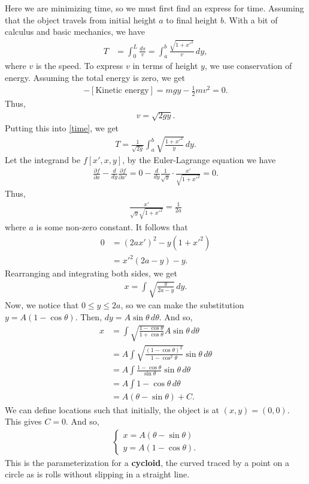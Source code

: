 \documentclass{article}
\newcommand{\p}{\partial}
\newcommand{\f}[2]{\frac{#1}{#2}}
\begin{document}
Here we are minimizing time, so we must first find an express for time. Assuming that the object travels from initial height $a$ to final height $b$. With a bit of calculus and basic mechanics, we have
\begin{align}\label{time}
T &= \int_{0}^{L} \frac{ds}{v} = \int_a^b \f{\sqrt{1 + x'^2}}{v}\,dy,
\end{align}
where $v$ is the speed. To express $v$ in terms of height $y$, we use conservation of energy. Assuming the total energy is zero, we get
\begin{align}
[\text{Potential Energy}] - [\text{Kinetic energy}] = mgy - \frac{1}{2}mv^2 = 0.
\end{align}
Thus,
\begin{align}
v = \sqrt{2gy}.
\end{align}
Putting this into \eqref{time}, we get
\begin{align}
T = \frac{1}{\sqrt{2g}}\int^b_a \sqrt{\f{1 + x'^2}{y}}\,dy.
\end{align}
Let the integrand be $f[x',x,y]$, by the Euler-Lagrange equation we have
\begin{align}
\frac{\p f}{\p x} - \f{d}{dy}\f{\p f}{\p x'} = 0 - \frac{d}{dy}\f{1}{\sqrt{y}}\cdot \f{x'}{\sqrt{1 + x'^2}}  = 0.
\end{align}
Thus,
\begin{align}
\f{x'}{\sqrt{y}\sqrt{1+x'^2}} = \f{1}{2a}
\end{align}
where $a$ is some non-zero constant. It follows that 
\begin{align}
0 &= (2ax')^2 - y(1+x'^2)\nonumber\\
&= x'^2(2a-y) - y.
\end{align}
Rearranging and integrating both sides, we get
\begin{align}
x = \int \sqrt{\frac{y}{2a-y}}\,dy.
\end{align}
Now, we notice that $0 \leq y \leq 2a$, so we can make the substitution $y = A(1-\cos\theta)$. Then, $dy = A\sin\theta\,d\theta$. And so,
\begin{align}
x 
&= \int \sqrt{\frac{1-\cos\theta}{1 + \cos\theta}}A\sin\theta\,d\theta \nonumber\\
&= A\int \sqrt{\frac{(1 - \cos\theta)^2}{1 - \cos^2\theta}}\sin\theta\,d\theta \nonumber\\
&= A\int \f{1-\cos\theta}{\sin\theta}\sin\theta\,d\theta\nonumber\\
&= A\int 1-\cos\theta \,d\theta\nonumber\\
&= A(\theta - \sin\theta) + C.
\end{align}
We can define locations such that initially, the object is at $(x,y) = (0,0)$. This gives $C = 0$. And so,
\begin{align}
\begin{cases}
x = A(\theta - \sin\theta)\\
y = A(1-\cos\theta).
\end{cases}
\end{align}
This is the parameterization for a \textbf{cycloid}, the curved traced by a point on a circle as is rolls without slipping in a straight line. 
\end{document}
